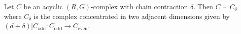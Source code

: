 Let $C$ be an acyclic $(R, G)$-complex with chain contraction $\delta$. Then $C \sim C_\delta$ where $C_\delta$ is the complex concentrated in two adjacent dimensions given by $(d + \delta)|C_{\text{odd}}: C_{\text{odd}} \to C_{\text{even}}$.
